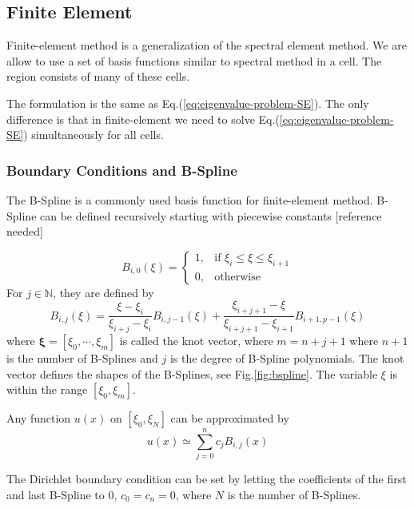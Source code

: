 \subsection{Finite Element}
Finite-element method is a generalization of the spectral element method. We are allow to use a set of basis functions similar to spectral method in a cell. The region consists of many of these cells.

The formulation is the same as Eq.(\ref{eq:eigenvalue-problem-SE}). The only difference is that in finite-element we need to solve Eq.(\ref{eq:eigenvalue-problem-SE}) simultaneously for all cells.

\subsubsection{Boundary Conditions and B-Spline}
The B-Spline is a commonly used basis function for finite-element method. B-Spline can be defined recursively starting with piecewise constants [reference needed]

\begin{equation}
	B_{i,0}(\xi) = \begin{cases}
		1, & \text{if } \xi_i\leq \xi \leq \xi_{i+1} \\
		0, & \text{otherwise}
	\end{cases}
\end{equation}
For $j\in\mathbb{N}$, they are defined by
\begin{equation}
	B_{i,j}(\xi) = \frac{\xi-\xi_i}{\xi_{i+j}-\xi_i}B_{i,j-1}(\xi)
	+ \frac{\xi_{i+j+1}-\xi}{\xi_{i+j+1}-\xi_{i+1}}B_{i+1,p-1}(\xi)
\end{equation}
where $\mathbf{\xi}=[\xi_0,\cdots,\xi_m]$ is called the knot vector, where $m=n+j+1$ where $n+1$ is the number of B-Splines and $j$ is the degree of B-Spline polynomials. The knot vector defines the shapes of the B-Splines, see Fig.\ref{fig:bspline}. The variable $\xi$ is within the range $[\xi_0, \xi_m]$.

Any function $u(x)$ on $[\xi_0,\xi_N]$ can be approximated by
\[ u(x) \simeq \sum_{j=0}^{n} c_jB_{i,j}(x) \]

The Dirichlet boundary condition can be set by letting the coefficients of the first and last B-Spline to 0, $c_{0}=c_{n} = 0$, where $N$ is the number of B-Splines.

